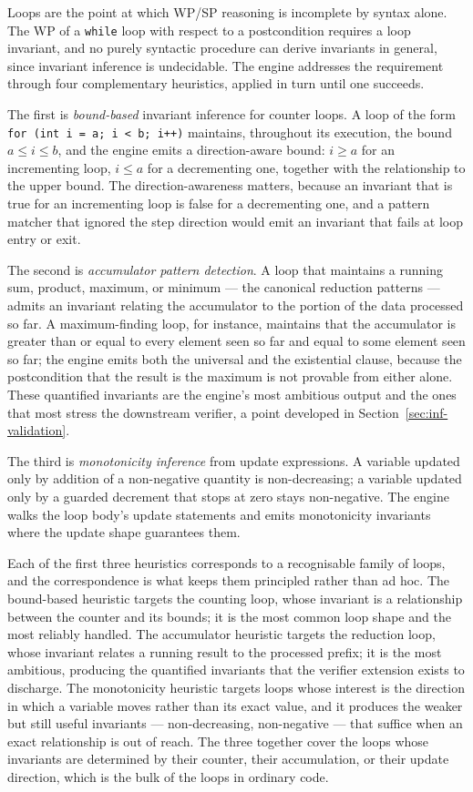 Loops are the point at which WP/SP reasoning is incomplete by syntax alone. The
WP of a \texttt{while} loop with respect to a postcondition requires a loop
invariant, and no purely syntactic procedure can derive invariants in general,
since invariant inference is undecidable. The engine addresses the requirement
through four complementary heuristics, applied in turn until one succeeds.

The first is \emph{bound-based} invariant inference for counter loops. A loop
of the form \texttt{for (int i = a; i < b; i++)} maintains, throughout its
execution, the bound $a \le i \le b$, and the engine emits a direction-aware
bound: $i \ge a$ for an incrementing loop, $i \le a$ for a decrementing one,
together with the relationship to the upper bound. The direction-awareness
matters, because an invariant that is true for an incrementing loop is false
for a decrementing one, and a pattern matcher that ignored the step direction
would emit an invariant that fails at loop entry or exit.

The second is \emph{accumulator pattern detection}. A loop that maintains a
running sum, product, maximum, or minimum --- the canonical reduction patterns
--- admits an invariant relating the accumulator to the portion of the data
processed so far. A maximum-finding loop, for instance, maintains that the
accumulator is greater than or equal to every element seen so far and equal to
some element seen so far; the engine emits both the universal and the
existential clause, because the postcondition that the result is the maximum is
not provable from either alone. These quantified invariants are the engine's
most ambitious output and the ones that most stress the downstream verifier, a
point developed in Section~\ref{sec:inf-validation}.

The third is \emph{monotonicity inference} from update expressions. A variable
updated only by addition of a non-negative quantity is non-decreasing; a
variable updated only by a guarded decrement that stops at zero stays
non-negative. The engine walks the loop body's update statements and emits
monotonicity invariants where the update shape guarantees them.

Each of the first three heuristics corresponds to a recognisable family of loops,
and the correspondence is what keeps them principled rather than ad hoc. The
bound-based heuristic targets the counting loop, whose invariant is a relationship
between the counter and its bounds; it is the most common loop shape and the most
reliably handled. The accumulator heuristic targets the reduction loop, whose
invariant relates a running result to the processed prefix; it is the most
ambitious, producing the quantified invariants that the verifier extension exists
to discharge. The monotonicity heuristic targets loops whose interest is the
direction in which a variable moves rather than its exact value, and it produces
the weaker but still useful invariants --- non-decreasing, non-negative --- that
suffice when an exact relationship is out of reach. The three together cover the
loops whose invariants are determined by their counter, their accumulation, or
their update direction, which is the bulk of the loops in ordinary code.

